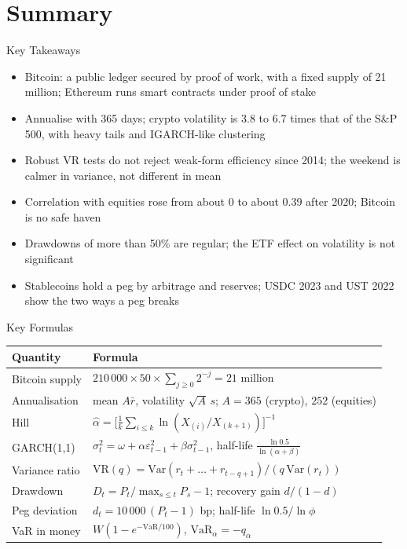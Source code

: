 \section{Summary}

\begin{frame}{Key Takeaways}
\itemsize{\small}
\begin{itemize}
    \item Bitcoin: a public ledger secured by proof of work, with a fixed supply of 21 million; Ethereum runs smart contracts under proof of stake
    \item Annualise with 365 days; crypto volatility is 3.8 to 6.7 times that of the S\&P 500, with heavy tails and IGARCH-like clustering
    \item Robust VR tests do not reject weak-form efficiency since 2014; the weekend is calmer in variance, not different in mean
    \item Correlation with equities rose from about 0 to about 0.39 after 2020; Bitcoin is no safe haven
    \item Drawdowns of more than 50\% are regular; the ETF effect on volatility is not significant
    \item Stablecoins hold a peg by arbitrage and reserves; USDC 2023 and UST 2022 show the two ways a peg breaks
\end{itemize}
\end{frame}

\begin{frame}{Key Formulas}
\itemsize{\small}
{\renewcommand{\arraystretch}{1.4}\begin{center}
\scriptsize
\begin{tabular}{ll}
\toprule
\textbf{Quantity} & \textbf{Formula} \\
\midrule
Bitcoin supply & $210\,000 \times 50 \times \sum_{j \ge 0} 2^{-j} = 21$ million \\
Annualisation & mean $A\bar r$, volatility $\sqrt{A}\,s$; $A = 365$ (crypto), $252$ (equities) \\
Hill & $\hat\alpha = \big[\frac1k\sum_{i \le k}\ln(X_{(i)}/X_{(k+1)})\big]^{-1}$ \\
GARCH(1,1) & $\sigma_t^2 = \omega + \alpha\varepsilon_{t-1}^2 + \beta\sigma_{t-1}^2$, half-life $\frac{\ln 0.5}{\ln(\alpha + \beta)}$ \\
Variance ratio & $\mathrm{VR}(q) = \mathrm{Var}(r_t + \dots + r_{t-q+1})/(q\,\mathrm{Var}(r_t))$ \\
Drawdown & $D_t = P_t/\max_{s \le t}P_s - 1$; recovery gain $d/(1 - d)$ \\
Peg deviation & $d_t = 10\,000\,(P_t - 1)$ bp; half-life $\ln 0.5/\ln\phi$ \\
VaR in money & $W(1 - e^{-\mathrm{VaR}/100})$, $\mathrm{VaR}_\alpha = -q_\alpha$ \\
\bottomrule
\end{tabular}
\end{center}
}
\end{frame}


